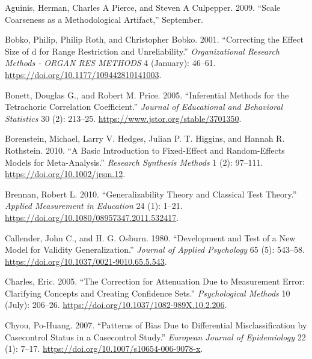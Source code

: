 \documentclass[
  letterpaper,
  DIV=11,
  numbers=noendperiod]{scrreprt}
\newlength{\cslhangindent}
\newlength{\cslentryspacingunit} %
\newenvironment{CSLReferences}[2] %
 {%
  \setlength{\parindent}{0pt}
  \ifodd #1
  \let\oldpar\par
  \def\par{\hangindent=\cslhangindent\oldpar}
  \fi
  \setlength{\parskip}{#2\cslentryspacingunit}
 }%
 {}
\begin{document}
\hypertarget{refs}{}
\begin{CSLReferences}{1}{0}
\leavevmode{}%
Aguinis, Herman, Charles A Pierce, and Steven A Culpepper. 2009.
{``Scale Coarseness as a Methodological Artifact,''} September.

\leavevmode{}%
Bobko, Philip, Philip Roth, and Christopher Bobko. 2001. {``Correcting
the Effect Size of d for Range Restriction and Unreliability.''}
\emph{Organizational Research Methods - ORGAN RES METHODS} 4 (January):
46--61. \url{https://doi.org/10.1177/109442810141003}.

\leavevmode{}%
Bonett, Douglas G., and Robert M. Price. 2005. {``Inferential Methods
for the Tetrachoric Correlation Coefficient.''} \emph{Journal of
Educational and Behavioral Statistics} 30 (2): 213--25.
\url{https://www.jstor.org/stable/3701350}.

\leavevmode{}%
Borenstein, Michael, Larry V. Hedges, Julian P. T. Higgins, and Hannah
R. Rothstein. 2010. {``A Basic Introduction to Fixed-Effect and
Random-Effects Models for Meta-Analysis.''} \emph{Research Synthesis
Methods} 1 (2): 97--111. \url{https://doi.org/10.1002/jrsm.12}.

\leavevmode{}%
Brennan, Robert L. 2010. {``Generalizability Theory and Classical Test
Theory.''} \emph{Applied Measurement in Education} 24 (1): 1--21.
\url{https://doi.org/10.1080/08957347.2011.532417}.

\leavevmode{}%
Callender, John C., and H. G. Osburn. 1980. {``Development and Test of a
New Model for Validity Generalization.''} \emph{Journal of Applied
Psychology} 65 (5): 543--58.
\url{https://doi.org/10.1037/0021-9010.65.5.543}.

\leavevmode{}%
Charles, Eric. 2005. {``The Correction for Attenuation Due to
Measurement Error: Clarifying Concepts and Creating Confidence Sets.''}
\emph{Psychological Methods} 10 (July): 206--26.
\url{https://doi.org/10.1037/1082-989X.10.2.206}.

\leavevmode{}%
Chyou, Po-Huang. 2007. {``Patterns of Bias Due to Differential
Misclassification by Case{\textendash}control Status in a
Case{\textendash}control Study.''} \emph{European Journal of
Epidemiology} 22 (1): 7--17.
\url{https://doi.org/10.1007/s10654-006-9078-x}.


\end{CSLReferences}
\end{document}
